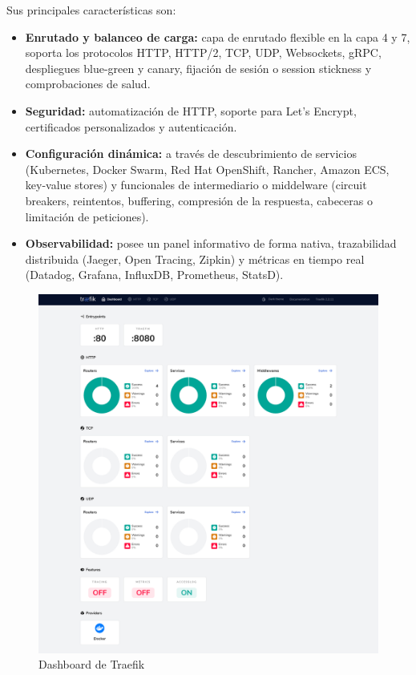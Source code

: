 Sus principales características son:
\begin{itemize}
    \item \textbf{Enrutado y balanceo de carga: }capa de enrutado flexible en la capa 4 y 7, soporta los protocolos HTTP, HTTP/2, TCP, UDP, Websockets, gRPC, despliegues blue-green y canary, fijación de sesión o session stickness y comprobaciones de salud.
    \item \textbf{Seguridad: }automatización de HTTP, soporte para Let’s Encrypt, certificados personalizados y autenticación.
    \item \textbf{Configuración dinámica: }a través de descubrimiento de servicios (Kubernetes, Docker Swarm, Red Hat OpenShift, Rancher, Amazon ECS, key-value stores) y funcionales de intermediario o middelware (circuit breakers, reintentos, buffering, compresión de la respuesta, cabeceras o limitación de peticiones).
    \item \textbf{Observabilidad: }posee un panel informativo de forma nativa, trazabilidad distribuida (Jaeger, Open Tracing, Zipkin) y métricas en tiempo real (Datadog, Grafana, InfluxDB, Prometheus, StatsD).
\end{itemize}

\begin{figure}[!htb]
    \centering
    \includegraphics[scale=0.2]{TT/img/implementacion/Traefik dashboard.png}
    \caption{Dashboard de Traefik}
    \label{graphic:TraefikDashboard}    
\end{figure}

